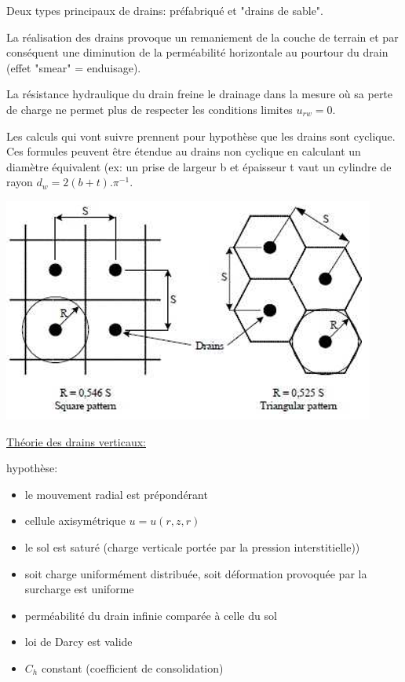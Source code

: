 Deux types principaux de drains: préfabriqué et "drains de sable".

La réalisation des drains provoque un remaniement de la couche de terrain et par conséquent une diminution de la perméabilité horizontale au pourtour du drain (effet "smear" = enduisage).

La résistance hydraulique du drain freine le drainage dans la mesure où sa perte de charge ne permet plus de respecter les conditions limites $u_{rw} = 0$.

Les calculs qui vont suivre prennent pour hypothèse que les drains sont cyclique. Ces formules peuvent être étendue au drains non cyclique en calculant un diamètre équivalent (ex: un prise de largeur b et épaisseur t vaut un cylindre de rayon $d_w = 2(b+t).\pi^{-1}$. 

\begin{center}
\includegraphics [scale=0.5]{pictures/plan.PNG}
\end{center}

\underline{Théorie des drains verticaux:}

hypothèse:
\begin{itemize}
    \item le mouvement radial est prépondérant
    \item cellule axisymétrique $u=u(r,z,r)$
    \item le sol est saturé (charge verticale portée par la pression interstitielle))
    \item soit charge uniformément distribuée, soit déformation provoquée par la surcharge est uniforme
    \item perméabilité du drain infinie comparée à celle du sol
    \item loi de Darcy est valide
    \item $C_h$ constant (coefficient de consolidation)
\end{itemize}

